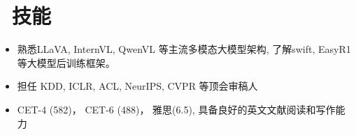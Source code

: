 \documentclass{resume}
\begin{document}
\section{\faCogs\ 技能}
\begin{itemize}[parsep=0.5ex]
    \item {熟悉LLaVA, InternVL, QwenVL 等主流多模态大模型架构, 了解swift, EasyR1等大模型后训练框架。} 
  \item 担任 KDD, ICLR, ACL, NeurIPS, CVPR 等顶会审稿人
  \item {CET-4 (582)， CET-6 (488)， 雅思(6.5), 具备良好的英文文献阅读和写作能力}
\end{itemize}





%
%
\end{document}
